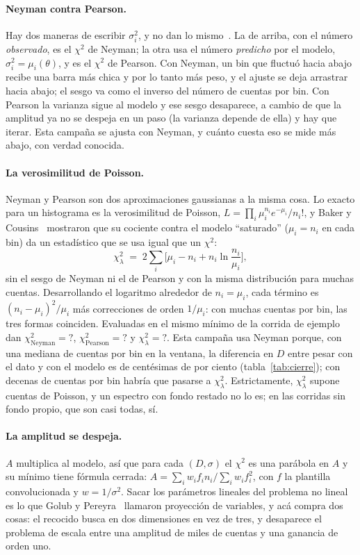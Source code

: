 \documentclass[11pt,a4paper]{article}
\newcommand{\faltaMacro}{\textbf{?}}
\providecommand{\EjChiNeyman}{\faltaMacro}\providecommand{\EjChiPearson}{\faltaMacro}
\providecommand{\EjChiBC}{\faltaMacro}\providecommand{\EjPullMedia}{\faltaMacro}
\begin{document}
\paragraph{Neyman contra Pearson.} Hay dos maneras de escribir $\sigma_i^2$,
y no dan lo mismo~\cite{baker1984}. La de arriba, con el número
\emph{observado}, es el $\chi^2$ de Neyman; la otra usa el número
\emph{predicho} por el modelo, $\sigma_i^2 = \mu_i(\theta)$, y es el
$\chi^2$ de Pearson. Con Neyman, un bin que fluctuó hacia abajo recibe una
barra más chica y por lo tanto más peso, y el ajuste se deja arrastrar hacia
abajo; el sesgo va como el inverso del número de cuentas por bin. Con Pearson
la varianza sigue al modelo y ese sesgo desaparece, a cambio de que la
amplitud ya no se despeja en un paso (la varianza depende de ella) y hay que
iterar. Esta campaña se ajusta con Neyman, y cuánto cuesta eso se mide más
abajo, con verdad conocida.

\paragraph{La verosimilitud de Poisson.} Neyman y Pearson son dos
aproximaciones gaussianas a la misma cosa. Lo exacto para un histograma es la
verosimilitud de Poisson, $L = \prod_i \mu_i^{n_i}e^{-\mu_i}/n_i!$, y Baker y
Cousins~\cite{baker1984} mostraron que su cociente contra el modelo
``saturado'' ($\mu_i = n_i$ en cada bin) da un estadístico que se usa igual
que un $\chi^2$:
\[
   \chi^2_\lambda \;=\; 2\sum_i\Big[\mu_i - n_i + n_i\ln\frac{n_i}{\mu_i}\Big],
\]
sin el sesgo de Neyman ni el de Pearson y con la misma distribución para
muchas cuentas. Desarrollando el logaritmo alrededor de $n_i = \mu_i$, cada
término es $(n_i - \mu_i)^2/\mu_i$ más correcciones de orden $1/\mu_i$: con
muchas cuentas por bin, las tres formas coinciden. Evaluadas en el mismo
mínimo de la corrida de ejemplo dan $\chi^2_{\text{Neyman}} = \EjChiNeyman$,
$\chi^2_{\text{Pearson}} = \EjChiPearson$ y $\chi^2_\lambda = \EjChiBC$. Esta
campaña usa Neyman porque, con una mediana de \CuentasBin{} cuentas por bin en
la ventana, la diferencia en $D$ entre pesar con el dato y con el modelo es de
centésimas de por ciento (tabla~\ref{tab:cierre}); con decenas de cuentas por
bin habría que pasarse a $\chi^2_\lambda$. Estrictamente, $\chi^2_\lambda$
supone cuentas de Poisson, y un espectro con fondo restado no lo es; en las
corridas sin fondo propio, que son casi todas, sí.

\paragraph{La amplitud se despeja.} $A$ multiplica al modelo, así que para
cada $(D, \sigma)$ el $\chi^2$ es una parábola en $A$ y su mínimo tiene
fórmula cerrada: $A = \sum_i w_i f_i n_i / \sum_i w_i f_i^2$, con $f$ la
plantilla convolucionada y $w = 1/\sigma^2$. Sacar los parámetros lineales
del problema no lineal es lo que Golub y Pereyra~\cite{golub1973} llamaron
proyección de variables, y acá compra dos cosas: el recocido busca en dos
dimensiones en vez de tres, y desaparece el problema de escala entre una
amplitud de miles de cuentas y una ganancia de orden uno.
\end{document}
